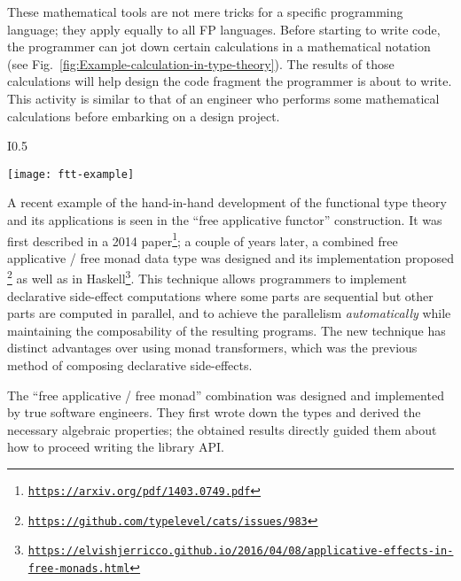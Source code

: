 These mathematical tools are not mere tricks for a specific programming
language; they apply equally to all FP languages. Before starting
to write code, the programmer can jot down certain calculations in
a mathematical notation (see Fig.\ \ref{fig:Example-calculation-in-type-theory}).
The results of those calculations will help design the code fragment
the programmer is about to write. This activity is similar to that
of an engineer who performs some mathematical calculations before
embarking on a design project.\begin{wrapfigure}{I}{0.5\textwidth}%
\begin{centering}
{\footnotesize{}\vspace{-0.5\baselineskip}
\texttt{[image: ftt-example]}\vspace{-0.5\baselineskip}
}{\footnotesize\par}
\par\end{centering}
{\footnotesize{}\caption{A programmer performs a derivation before writing Haskell code.\label{fig:Example-calculation-in-type-theory}}
}{\footnotesize\par}

\vspace{-0.5\baselineskip}
\end{wrapfigure}%
A recent example of the hand-in-hand development of the functional
type theory and its applications is seen in the ``free applicative
functor'' construction. It was first described in a 2014 paper\footnote{\texttt{\href{https://arxiv.org/pdf/1403.0749.pdf}{https://arxiv.org/pdf/1403.0749.pdf}}};
a couple of years later, a combined free applicative / free monad
data type was designed and its implementation proposed \footnote{\texttt{\href{https://github.com/typelevel/cats/issues/983}{https://github.com/typelevel/cats/issues/983}}}
as well as in Haskell\footnote{\texttt{\href{https://elvishjerricco.github.io/2016/04/08/applicative-effects-in-free-monads.html}{https://elvishjerricco.github.io/2016/04/08/applicative-effects-in-free-monads.html}}}.
This technique allows programmers to implement declarative side-effect
computations where some parts are sequential but other parts are computed
in parallel, and to achieve the parallelism \emph{automatically} while
maintaining the composability of the resulting programs. The new technique
has distinct advantages over using monad transformers, which was the
previous method of composing declarative side-effects.

The ``free applicative / free monad'' combination was designed and
implemented by true software engineers. They first wrote down the
types and derived the necessary algebraic properties; the obtained
results directly guided them about how to proceed writing the library
API.

